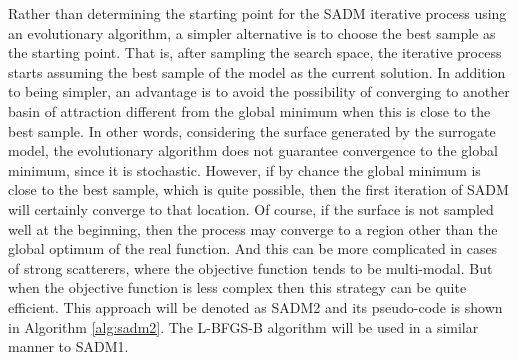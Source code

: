 				
				Rather than determining the starting point for the SADM iterative process using an evolutionary algorithm, a simpler alternative is to choose the best sample as the starting point. That is, after sampling the search space, the iterative process starts assuming the best sample of the model as the current solution. In addition to being simpler, an advantage is to avoid the possibility of converging to another basin of attraction different from the global minimum when this is close to the best sample. In other words, considering the surface generated by the surrogate model, the evolutionary algorithm does not guarantee convergence to the global minimum, since it is stochastic. However, if by chance the global minimum is close to the best sample, which is quite possible, then the first iteration of SADM will certainly converge to that location. Of course, if the surface is not sampled well at the beginning, then the process may converge to a region other than the global optimum of the real function. And this can be more complicated in cases of strong scatterers, where the objective function tends to be multi-modal. But when the objective function is less complex then this strategy can be quite efficient. This approach will be denoted as SADM2 and its pseudo-code is shown in Algorithm \ref{alg:sadm2}. The L-BFGS-B algorithm will be used in a similar manner to SADM1.
				
